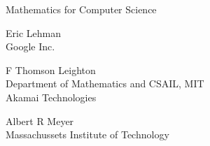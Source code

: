 \thispagestyle{empty}

\begin{center}
\begin{minipage}{4.5in}
\begin{center}
\rule{0in}{2in}
{\huge Mathematics for Computer Science}\\

\Stamp


\vspace{1in}
{\LARGE Eric Lehman}\\
{\large Google Inc.}

\vspace{0.3in}
{\LARGE F Thomson Leighton}\\
{\large Department of Mathematics and CSAIL, MIT}\\
{\large Akamai Technologies}

\vspace{0.3in}
{\LARGE Albert R Meyer}\\
{\large Massachussets Institute of Technology}

\end{center}

\end{minipage}
\end{center}
\coursecopyright

\tableofcontents



\endinput
